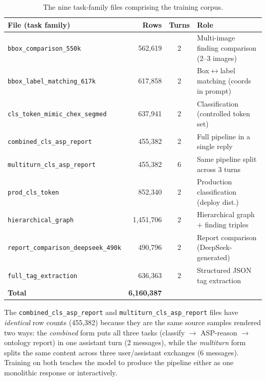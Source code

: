 \documentclass[11pt,a4paper]{article}
\begin{document}
\begin{table}[H]
\centering\footnotesize
\caption{The nine task-family files comprising the training corpus.}
\label{tab:files}
\begin{tabularx}{\textwidth}{L r c L}
\toprule
\textbf{File (task family)} & \textbf{Rows} & \textbf{Turns} & \textbf{Role} \\
\midrule
\texttt{bbox\_comparison\_550k} & 562{,}619 & 2 & Multi-image finding comparison (2--3 images) \\
\texttt{bbox\_label\_matching\_617k} & 617{,}858 & 2 & Box$\leftrightarrow$label matching (coords in prompt) \\
\texttt{cls\_token\_mimic\_chex\_segmed} & 637{,}941 & 2 & Classification (controlled token set) \\
\texttt{combined\_cls\_asp\_report} & 455{,}382 & 2 & Full pipeline in a single reply \\
\texttt{multiturn\_cls\_asp\_report} & 455{,}382 & 6 & Same pipeline split across 3 turns \\
\texttt{prod\_cls\_token} & 852{,}340 & 2 & Production classification (deploy dist.) \\
\texttt{hierarchical\_graph} & 1{,}451{,}706 & 2 & Hierarchical graph $+$ finding triples \\
\texttt{report\_comparison\_deepseek\_490k} & 490{,}796 & 2 & Report comparison (DeepSeek-generated) \\
\texttt{full\_tag\_extraction} & 636{,}363 & 2 & Structured JSON tag extraction \\
\midrule
\textbf{Total} & \textbf{6{,}160{,}387} & & \\
\bottomrule
\end{tabularx}
\end{table}

The \texttt{combined\_cls\_asp\_report} and \texttt{multiturn\_cls\_asp\_report} files have \emph{identical} row counts (455{,}382) because they are the same source samples rendered two ways: the \emph{combined} form puts all three tasks (classify $\rightarrow$ ASP-reason $\rightarrow$ ontology report) in one assistant turn (2 messages), while the \emph{multiturn} form splits the same content across three user/assistant exchanges (6 messages). Training on both teaches the model to produce the pipeline either as one monolithic response or interactively.
\end{document}

